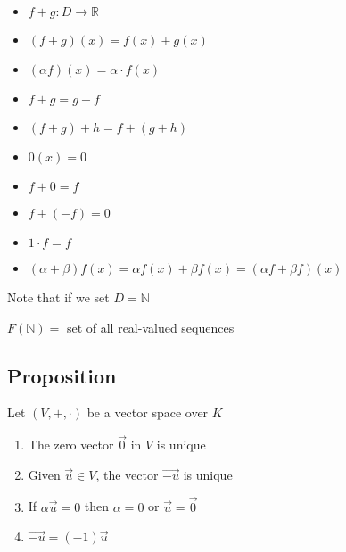 \documentclass[12pt]{article}
\renewcommand{\v}[1]{\overrightarrow{#1}}
\newcommand{\real}[0]{\mathbb{R}}
\renewcommand{\natural}[0]{\mathbb{N}}
\begin{document}

\begin{itemize}
	\item $f + g : D \rightarrow \real$
	\item $(f + g)(x) = f(x) + g(x)$
	\item $(\alpha f)(x) = \alpha \cdot f(x)$
	\item $f + g = g + f$
	\item $(f + g) + h = f + (g + h)$
	\item $0(x) = 0$
	\item $f + 0 = f$
	\item $f + (-f) = 0$
	\item $1 \cdot f = f$
	\item $(\alpha + \beta) f(x) = \alpha f(x) + \beta f(x) = (\alpha f + \beta f)(x)$
\end{itemize}

Note that if we set $D = \natural$

$F(\natural) =$ set of all real-valued sequences

\subsection{Proposition}

Let $(V, +, \cdot)$ be a vector space over $K$


\begin{enumerate}
	\item The zero vector $\v{0}$ in $V$ is unique
	\item Given $\v{u} \in V$, the vector $\v{-u}$ is unique
	\item If $\alpha \v{u} = 0$ then $\alpha = 0$ or $\v{u} = \v{0}$
	\item $\v{-u} = (-1) \v{u}$
\end{enumerate}
\end{document}
